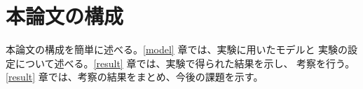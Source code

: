 \documentclass[body]{subfiles}
\begin{document}
\section{本論文の構成}
本論文の構成を簡単に述べる。\ref{model} 章では、実験に用いたモデルと
実験の設定について述べる。\ref{result} 章では、実験で得られた結果を示し、
考察を行う。\ref{result} 章では、考察の結果をまとめ、今後の課題を示す。
\end{document}
